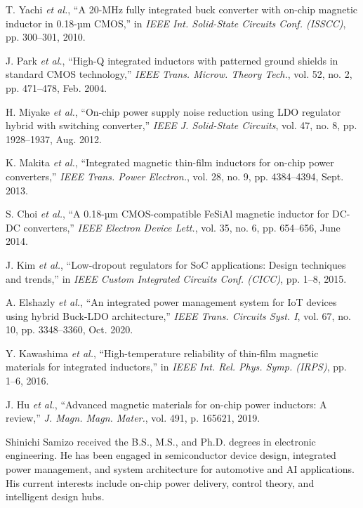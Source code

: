 \documentclass[journal]{IEEEtran}
\begin{document}
\begin{thebibliography}{10}

T. Yachi \emph{et al.}, ``A 20-MHz fully integrated buck converter with on-chip magnetic inductor in 0.18-µm CMOS,'' in \emph{IEEE Int. Solid-State Circuits Conf. (ISSCC)}, pp. 300--301, 2010.

J. Park \emph{et al.}, ``High-Q integrated inductors with patterned ground shields in standard CMOS technology,'' \emph{IEEE Trans. Microw. Theory Tech.}, vol. 52, no. 2, pp. 471--478, Feb. 2004.

H. Miyake \emph{et al.}, ``On-chip power supply noise reduction using LDO regulator hybrid with switching converter,'' \emph{IEEE J. Solid-State Circuits}, vol. 47, no. 8, pp. 1928--1937, Aug. 2012.

K. Makita \emph{et al.}, ``Integrated magnetic thin-film inductors for on-chip power converters,'' \emph{IEEE Trans. Power Electron.}, vol. 28, no. 9, pp. 4384--4394, Sept. 2013.

S. Choi \emph{et al.}, ``A 0.18-µm CMOS-compatible FeSiAl magnetic inductor for DC-DC converters,'' \emph{IEEE Electron Device Lett.}, vol. 35, no. 6, pp. 654--656, June 2014.

J. Kim \emph{et al.}, ``Low-dropout regulators for SoC applications: Design techniques and trends,'' in \emph{IEEE Custom Integrated Circuits Conf. (CICC)}, pp. 1--8, 2015.

A. Elshazly \emph{et al.}, ``An integrated power management system for IoT devices using hybrid Buck-LDO architecture,'' \emph{IEEE Trans. Circuits Syst. I}, vol. 67, no. 10, pp. 3348--3360, Oct. 2020.

Y. Kawashima \emph{et al.}, ``High-temperature reliability of thin-film magnetic materials for integrated inductors,'' in \emph{IEEE Int. Rel. Phys. Symp. (IRPS)}, pp. 1--6, 2016.

J. Hu \emph{et al.}, ``Advanced magnetic materials for on-chip power inductors: A review,'' \emph{J. Magn. Magn. Mater.}, vol. 491, p. 165621, 2019.

\end{thebibliography}

\begin{IEEEbiography}{Shinichi Samizo}
received the B.S., M.S., and Ph.D. degrees in electronic engineering. He has been engaged in semiconductor device design, integrated power management, and system architecture for automotive and AI applications. His current interests include on-chip power delivery, control theory, and intelligent design hubs.
\end{IEEEbiography}
\end{document}
